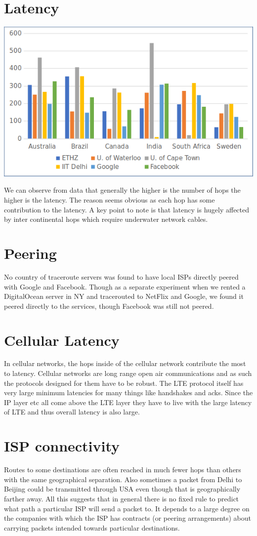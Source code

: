 \documentclass[12pt]{article}
\begin{document}
\section{Latency}
\begin{center}
\includegraphics[scale=0.86]{lat.png}
\end{center}
We can observe from data that generally the higher is the number of hops the higher is the latency. The reason seems obvious as each hop has some contribution to the latency. A key point to note is that latency is hugely affected by inter continental hops which require underwater network cables.
\section{Peering}
No country of traceroute servers was found to have local ISPs directly peered with Google and
Facebook. Though as a separate experiment when we  rented a DigitalOcean server in NY and tracerouted to NetFlix and Google, we found it peered directly to the services, though Facebook was still not peered.

\section{Cellular Latency}

In cellular networks, the hops inside of the cellular network contribute the most to latency. Cellular networks are long range open air communications and as such the protocols designed for them have to be robust. The LTE protocol itself has very large minimum latencies for many things like handshakes  and acks. Since the IP layer etc all come above the LTE layer they have to live with the large latency of LTE and thus overall latency is also large.
 
\section{ISP connectivity}

Routes to some destinations are often reached in much fewer hops than others with the same geographical separation. Also sometimes a packet from Delhi to Beijing could be transmitted through USA even though that is geographically farther away. All this suggests that in general there is no fixed rule to predict what path a particular ISP will send a packet to. It depends to a large degree on the companies with which the ISP has contracts (or peering arrangements) about carrying packets intended towards particular destinations. 
\end{document}
